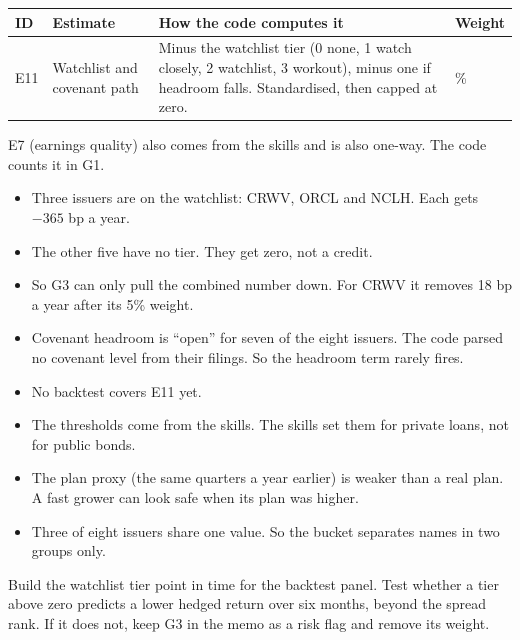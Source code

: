 \newpage
{}
{\footnotesize
\begin{tabularx}{\linewidth}{@{}>{\raggedright\arraybackslash}p{8mm}>{\raggedright\arraybackslash}p{34mm}>{\raggedright\arraybackslash}X>{\raggedright\arraybackslash}p{12mm}@{}}
\toprule
ID & Estimate & How the code computes it & Weight \\
\midrule
E11 & Watchlist and covenant path & Minus the watchlist tier (0 none, 1 watch closely, 2 watchlist, 3 workout), minus one if headroom falls. Standardised, then capped at zero. & 5\% \\
\bottomrule
\end{tabularx}
}
E7 (earnings quality) also comes from the skills and is also one-way. The code counts it in G1.

\begin{center}

\end{center}
\begin{itemize}
\item Three issuers are on the watchlist: CRWV, ORCL and NCLH. Each gets $-365$ bp a year.
\item The other five have no tier. They get zero, not a credit.
\item So G3 can only pull the combined number down. For CRWV it removes 18 bp a year after its 5\% weight.
\item Covenant headroom is ``open'' for seven of the eight issuers. The code parsed no covenant level from their filings. So the headroom term rarely fires.
\end{itemize}

\begin{itemize}
\item No backtest covers E11 yet.
\item The thresholds come from the skills. The skills set them for private loans, not for public bonds.
\item The plan proxy (the same quarters a year earlier) is weaker than a real plan. A fast grower can look safe when its plan was higher.
\item Three of eight issuers share one value. So the bucket separates names in two groups only.
\end{itemize}

Build the watchlist tier point in time for the backtest panel. Test whether a tier above zero predicts a lower hedged return over six months, beyond the spread rank. If it does not, keep G3 in the memo as a risk flag and remove its weight.

